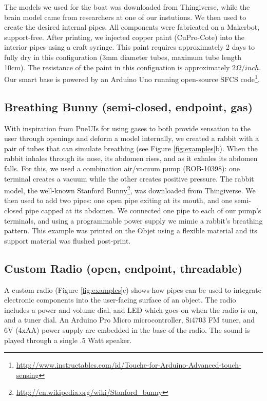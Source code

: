 The models we used for the boat was downloaded from Thingiverse, while the brain model came from researchers at one of our instutions. We then used \systemname to create the desired internal pipes. All components were fabricated on a Makerbot, support-free.  After printing, we injected copper paint (CuPro-Cote) into the interior pipes using a craft syringe.  This paint requires approximately 2 days to fully dry in this configuration (3mm diameter tubes, maximum tube length 10cm).  The resistance of the paint in this configuation is approximately $2\Omega / inch.$  Our smart base is powered by an Arduino Uno running open-source SFCS code\footnote{\url{http://www.instructables.com/id/Touche-for-Arduino-Advanced-touch-sensing}}.

\subsection{Breathing Bunny (semi-closed, endpoint, gas)}

With inspiration from PneUIs \cite{Yao-pneui} for using gases to both provide sensation to the user through openings and deform a model internally, we created a rabbit with a pair of tubes that can simulate breathing (see Figure \ref{fig:examples}b).  When the rabbit inhales through its nose, its abdomen rises, and as it exhales its abdomen falls.  For this, we used a combination air/vacuum pump (ROB-10398): one terminal creates a vacuum while the other creates positive pressure.  
The rabbit model, the well-known Stanford Bunny\footnote{\url{http://en.wikipedia.org/wiki/Stanford_bunny}}, was downloaded from Thingiverse. We then used \systemname to add two pipes: one open pipe exiting at its mouth, and one semi-closed pipe capped at its abdomen.  We connected one pipe to each of our pump's terminals, and using a programmable power supply we mimic a rabbit's breathing pattern.  This example was printed on the Objet using a flexible material and its support material was flushed post-print.

\subsection{Custom Radio (open, endpoint, threadable)}
A custom radio (Figure \ref{fig:examples}c) shows how pipes can be used to integrate electronic components into the user-facing surface of an object. The radio includes a power and volume dial, and LED which goes on when the radio is on, and a tuner dial. An Arduino Pro Micro microcontroller, Si4703 FM tuner, and 6V (4xAA) power supply are embedded in the base of the radio. The sound is played through a single .5 Watt speaker. %

